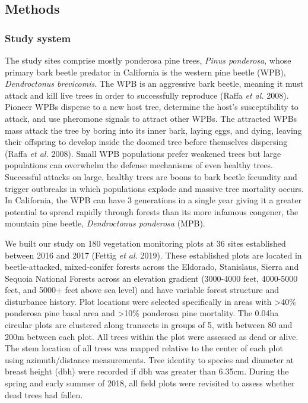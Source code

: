 \documentclass[]{article}
\begin{document}
\subsection{Methods}\label{methods}

\subsubsection{Study system}\label{study-system}

The study sites comprise mostly ponderosa pine trees, \emph{Pinus
ponderosa}, whose primary bark beetle predator in California is the
western pine beetle (WPB), \emph{Dendroctonus brevicomis}. The WPB is an
aggressive bark beetle, meaning it must attack and kill live trees in
order to successfully reproduce (Raffa \emph{et al.} 2008). Pioneer WPBs
disperse to a new host tree, determine the host's susceptibility to
attack, and use pheromone signals to attract other WPBs. The attracted
WPBs mass attack the tree by boring into its inner bark, laying eggs,
and dying, leaving their offspring to develop inside the doomed tree
before themselves dispersing (Raffa \emph{et al.} 2008). Small WPB
populations prefer weakened trees but large populations can overwhelm
the defense mechanisms of even healthy trees. Successful attacks on
large, healthy trees are boons to bark beetle fecundity and trigger
outbreaks in which populations explode and massive tree mortality
occurs. In California, the WPB can have 3 generations in a single year
giving it a greater potential to spread rapidly through forests than its
more infamous congener, the mountain pine beetle, \emph{Dendroctonus
ponderosa} (MPB).

We built our study on 180 vegetation monitoring plots at 36 sites
established between 2016 and 2017 (Fettig \emph{et al.} 2019). These
established plots are located in beetle-attacked, mixed-conifer forests
across the Eldorado, Stanislaus, Sierra and Sequoia National Forests
across an elevation gradient (3000-4000 feet, 4000-5000 feet, and 5000+
feet above sea level) and have variable forest structure and disturbance
history. Plot locations were selected specifically in areas with
\textgreater{}40\% ponderosa pine basal area and \textgreater{}10\%
ponderosa pine mortality. The 0.04ha circular plots are clustered along
transects in groups of 5, with between 80 and 200m between each plot.
All trees within the plot were assessed as dead or alive. The stem
location of all trees was mapped relative to the center of each plot
using azimuth/distance measurements. Tree identity to species and
diameter at breast height (dbh) were recorded if dbh was greater than
6.35cm. During the spring and early summer of 2018, all field plots were
revisited to assess whether dead trees had fallen.
\end{document}
